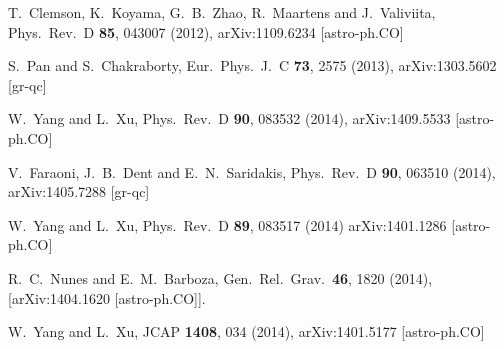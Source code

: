 \documentclass[superscriptaddress,oneolumn,secnumarabic,
amssymb,amsmath,nobibnotes,aps,prd,showpacs,nofootinbib]{revtex4}%
\begin{document}
\begin{thebibliography}{*}
T.~Clemson, K.~Koyama, G.~B.~Zhao, R.~Maartens and J.~Valiviita,
Phys.\ Rev.\ D {\bf 85}, 043007 (2012),
arXiv:1109.6234 [astro-ph.CO]




  S.~Pan and S.~Chakraborty,
  Eur.\ Phys.\ J.\ C {\bf 73}, 2575 (2013),
  arXiv:1303.5602 [gr-qc]


W.~Yang and L.~Xu,
Phys.\ Rev.\ D {\bf 90}, 083532 (2014),
arXiv:1409.5533 [astro-ph.CO]


  V.~Faraoni, J.~B.~Dent and E.~N.~Saridakis,
  Phys.\ Rev.\ D {\bf 90}, 063510 (2014),
  arXiv:1405.7288 [gr-qc]


W.~Yang and L.~Xu,
Phys.\ Rev.\ D {\bf 89}, 083517 (2014)
arXiv:1401.1286 [astro-ph.CO]


  R.~C.~Nunes and E.~M.~Barboza,
  Gen.\ Rel.\ Grav.\  {\bf 46}, 1820 (2014),
  [arXiv:1404.1620 [astro-ph.CO]].

W.~Yang and L.~Xu,
JCAP {\bf 1408}, 034 (2014),
arXiv:1401.5177 [astro-ph.CO]


\end{thebibliography}
\end{document}
